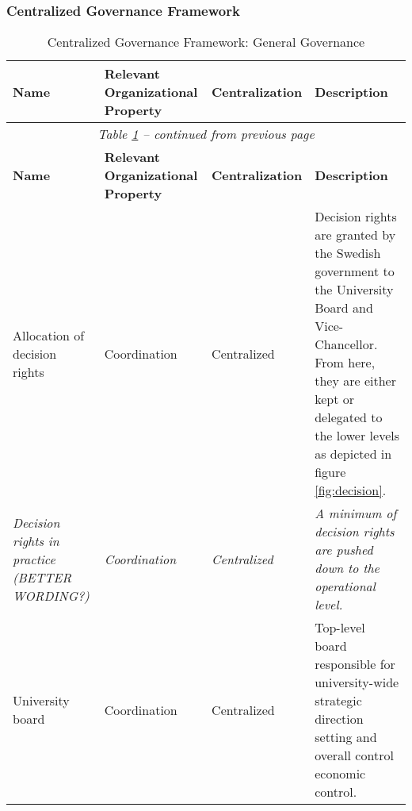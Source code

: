 
\subsubsection{Centralized Governance Framework}


\begin{center}
\begin{longtable}{ | p{} | p{}| p{} | p{}|}
\caption{Centralized Governance Framework: General Governance} \label{table:centralGeneralGovernance} \\
%
\hline
\textbf{Name} & 
\textbf{Relevant Organizational Property} &
\textbf{Centralization} &  
\textbf{Description} \\ \hline
\endfirsthead
%
\multicolumn{4}{c}{\textit{Table \ref{table:centralGeneralGovernance} -- continued from previous page}} \\  
\hline
\textbf{Name} & 
\textbf{Relevant Organizational Property} &
\textbf{Centralization} &  
\textbf{Description} \\ \hline
\endhead
%
 Allocation of decision rights & 
 Coordination &
 Centralized & 
 Decision rights are granted by the Swedish government to the University Board and Vice-Chancellor. From here, they are either kept or delegated to the lower levels as depicted in figure \ref{fig:decision}. \\
%
\hline
%
 \textit{Decision rights in practice (BETTER WORDING?)} & 
 \textit{Coordination} &
 \textit{Centralized} & 
 \textit{A minimum of decision rights are pushed down to the operational level.} \\
%
\hline
%
%
%
 University board &
 Coordination &
 Centralized &
 Top-level board responsible for university-wide strategic direction setting and overall control economic control. \\
%
\hline
%
 

\end{longtable}
\end{center}
